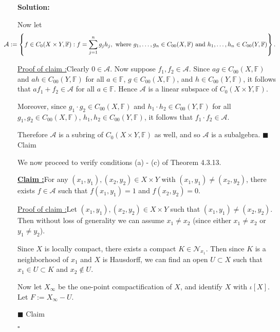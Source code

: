 \documentclass[12pt]{article}
\newcounter{ProofCounter}
\newcounter{ClaimCounter}[ProofCounter]
\newenvironment{Solution}{\stepcounter{ProofCounter}\textbf{Solution:}}{\hfill$\square$}
\newenvironment{claim}[1]{\vspace{1mm}\stepcounter{ClaimCounter}\par\noindent\underline{\bf Claim \theClaimCounter:}\space#1}{}
\newenvironment{claimproof}[1]{\par\noindent\underline{Proof of claim \theClaimCounter:}\space#1}{\hfill $\blacksquare$ Claim \theClaimCounter}
\begin{document}
\begin{Solution}
\begin{enumerate}
      Now let 
      \[
        \hspace{-8mm} \mathcal{A} := \left\{ f \in C_0(X\times Y, \mathbb{F}) : f = \sum_{j=1}^{n}g_j h_j, \text{ where } g_1, \dots, g_n \in C_{00}(X,
        \mathbb{F}) \text{ and } h_1, \dots, h_n \in C_{00}(Y, \mathbb{F}) \right\}.
      \]
      \begin{claimproof}
        Clearly $0 \in \mathcal{A}$. Now suppose $f_1, f_2 \in \mathcal{A}$. Since $a g \in C_{00}(X, \mathbb{F})$ and $a h \in C_{00}(Y,
        \mathbb{F})$ for all $a \in \mathbb{F}$, $g \in C_{00}(X, \mathbb{F})$, and $h \in C_{00}(Y, \mathbb{F})$, it follows that $a f_1 + f_2
        \in \mathcal{A}$ for all $a \in \mathbb{F}$. Hence $\mathcal{A}$ is a linear subspace of $C_0(X \times Y, \mathbb{F})$.

        Moreover, since $g_1 \cdot g_2 \in C_{00}(X, \mathbb{F})$ and $h_1 \cdot h_2 \in C_{00}(Y, \mathbb{F})$ for all $g_1, g_2 \in C_{00}(X,
        \mathbb{F})$, $h_1, h_2 \in C_{00}(Y, \mathbb{F})$, it follows that $f_1 \cdot f_2 \in \mathcal{A}$.

        Therefore $\mathcal{A}$ is a subring of $C_0(X \times Y, \mathbb{F})$ as well, and so $\mathcal{A}$ is a subalgebra.
      \end{claimproof}

      We now proceed to verify conditions (a) - (c) of Theorem 4.3.13.

      \begin{claim}
        For any $(x_1, y_1), (x_2, y_2) \in X \times Y$ with $(x_1, y_1) \neq (x_2, y_2)$, there exists $f \in \mathcal{A}$
        such that $f(x_1, y_1) = 1$ and $f(x_2, y_2) = 0$.
      \end{claim}
      \begin{claimproof}
        Let $(x_1, y_1), (x_2, y_2) \in X \times Y$ such that $(x_1, y_1) \neq (x_2, y_2)$. Then without loss of generality we can assume $x_1 \neq
        x_2$ (since either $x_1 \neq x_2$ or $y_1 \neq y_2$). 
        
        Since $X$ is locally compact, there exists a compact $K \in \mathcal{N}_{x_1}$. Then since $K$ is a neighborhood of $x_1$ and $X$ is
        Hausdorff, we can find an open $U \subset X$ such that $x_1 \in U \subset K$ and $x_2 \notin U$.

        Now let $X_{\infty}$ be the one-point compactification of $X$, and identify $X$ with $\iota[X]$. Let $F := X_{\infty} - U$.


\end{claimproof}
\end{enumerate}
\end{Solution}
\end{document}

